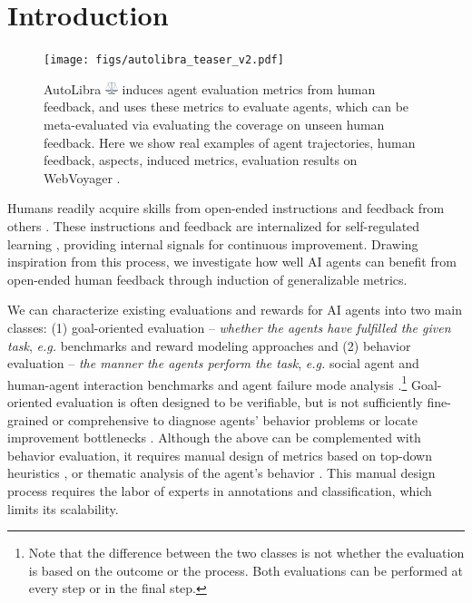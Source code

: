 \section{Introduction}
\begin{figure}[!t]
    \centering
    \texttt{[image: figs/autolibra\_teaser\_v2.pdf]}
    \caption{AutoLibra \protect\includegraphics[height=1em]{figs/scale.png} induces agent evaluation metrics from human feedback, and uses these metrics to evaluate agents, which can be meta-evaluated via evaluating the coverage on unseen human feedback. Here we show real examples of agent trajectories, human feedback, aspects, induced metrics, evaluation results on WebVoyager \citep{he2024webvoyager}.}
    \label{fig:teaser}
\end{figure}

Humans readily acquire skills from open-ended instructions and feedback from others \citep{tomasello1993cultural}.  
These instructions and feedback are internalized for self-regulated learning
\citep{pintrich2002development,nicol2006formative},
providing internal signals for continuous improvement. 
Drawing inspiration from this process, we investigate how well AI agents can benefit from open-ended human feedback through induction of generalizable metrics. 

We can characterize existing evaluations and rewards for AI agents
into two main classes: (1) goal-oriented evaluation --
\emph{whether the agents have fulfilled the given task},
\emph{e.g.} benchmarks \citep{zhouwebarena,jimenezswe,chan2024mle,paglieri2024balrog} and reward
modeling approaches \citep{pan2024autonomous,chen2025scaling,choudhury2025process}
and (2) behavior evaluation -- \emph{the manner the agents perform the task},
\emph{e.g.} social agent and human-agent interaction benchmarks \citep{zhousotopia,shao2024collaborative}
and agent failure mode analysis \citep{pan2025why,zhang2023effects,yang2023behavioral}.\footnote{Note that the difference between the two classes is not whether the evaluation is based on the outcome or the process.
Both evaluations can be performed at every step or in the final step.}
Goal-oriented evaluation is often designed to be verifiable, but is not sufficiently fine-grained
or comprehensive to diagnose agents' behavior problems or locate improvement bottlenecks \citep{yehudai2025survey}.  
Although the above can be complemented with behavior evaluation, it requires manual design of metrics based on top-down heuristics
\citep{zhousotopia}, or thematic analysis of the agent's behavior \citep{shao2024collaborative,pan2025why}.
This manual design process requires the labor of experts in annotations and classification, which limits its scalability.

